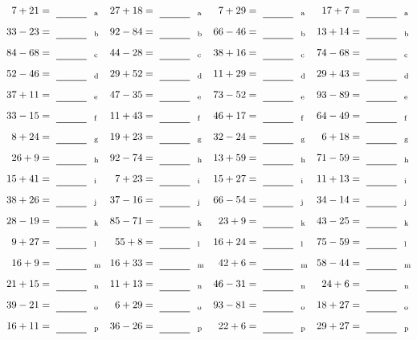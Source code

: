 \documentclass
[
  draft    = true,
  fontsize = 11pt,
  parskip  = half-
]
{scrartcl}
\begin{document}
\clearpage
\begin{align*}
    \pline{7+21}&=\rline{a}
  & \pline{27+18}&=\rline{a}
  & \pline{7+29}&=\rline{a}
  & \pline{17+7}&=\rline{a} \\[1ex]
    \pline{33-23}&=\rline{b}
  & \pline{92-84}&=\rline{b}
  & \pline{66-46}&=\rline{b}
  & \pline{13+14}&=\rline{b} \\[1ex]
    \pline{84-68}&=\rline{c}
  & \pline{44-28}&=\rline{c}
  & \pline{38+16}&=\rline{c}
  & \pline{74-68}&=\rline{c} \\[1ex]
    \pline{52-46}&=\rline{d}
  & \pline{29+52}&=\rline{d}
  & \pline{11+29}&=\rline{d}
  & \pline{29+43}&=\rline{d} \\[1ex]
    \pline{37+11}&=\rline{e}
  & \pline{47-35}&=\rline{e}
  & \pline{73-52}&=\rline{e}
  & \pline{93-89}&=\rline{e} \\[1ex]
    \pline{33-15}&=\rline{f}
  & \pline{11+43}&=\rline{f}
  & \pline{46+17}&=\rline{f}
  & \pline{64-49}&=\rline{f} \\[1ex]
    \pline{8+24}&=\rline{g}
  & \pline{19+23}&=\rline{g}
  & \pline{32-24}&=\rline{g}
  & \pline{6+18}&=\rline{g} \\[1ex]
    \pline{26+9}&=\rline{h}
  & \pline{92-74}&=\rline{h}
  & \pline{13+59}&=\rline{h}
  & \pline{71-59}&=\rline{h} \\[1ex]
    \pline{15+41}&=\rline{i}
  & \pline{7+23}&=\rline{i}
  & \pline{15+27}&=\rline{i}
  & \pline{11+13}&=\rline{i} \\[1ex]
    \pline{38+26}&=\rline{j}
  & \pline{37-16}&=\rline{j}
  & \pline{66-54}&=\rline{j}
  & \pline{34-14}&=\rline{j} \\[1ex]
    \pline{28-19}&=\rline{k}
  & \pline{85-71}&=\rline{k}
  & \pline{23+9}&=\rline{k}
  & \pline{43-25}&=\rline{k} \\[1ex]
    \pline{9+27}&=\rline{l}
  & \pline{55+8}&=\rline{l}
  & \pline{16+24}&=\rline{l}
  & \pline{75-59}&=\rline{l} \\[1ex]
    \pline{16+9}&=\rline{m}
  & \pline{16+33}&=\rline{m}
  & \pline{42+6}&=\rline{m}
  & \pline{58-44}&=\rline{m} \\[1ex]
    \pline{21+15}&=\rline{n}
  & \pline{11+13}&=\rline{n}
  & \pline{46-31}&=\rline{n}
  & \pline{24+6}&=\rline{n} \\[1ex]
    \pline{39-21}&=\rline{o}
  & \pline{6+29}&=\rline{o}
  & \pline{93-81}&=\rline{o}
  & \pline{18+27}&=\rline{o} \\[1ex]
    \pline{16+11}&=\rline{p}
  & \pline{36-26}&=\rline{p}
  & \pline{22+6}&=\rline{p}
  & \pline{29+27}&=\rline{p}
\end{align*}
\end{document}
